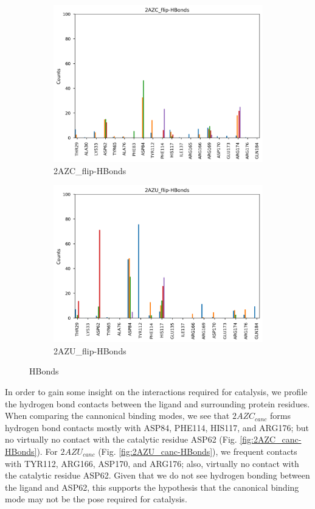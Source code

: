\documentclass[fleqn,10pt]{wlscirep}
\begin{document}
\begin{figure}[!ht]
\begin{subfigure}{.45\textwidth}
     \includegraphics[width=.95\linewidth]{2AZC_flip/2AZC_flip-HBonds.png}
     \caption{2AZC_{flip}-HBonds}
     \label{fig:2AZC_flip-HBonds}
   \end{subfigure}
    \begin{subfigure}{.45\textwidth}
     \centering
     \includegraphics[width=.95\linewidth]{2AZU_flip/2AZU_flip-HBonds.png}
     \caption{2AZU_{flip}-HBonds}
     \label{fig:2AZU_flip-HBonds}
   \end{subfigure}
\caption{HBonds}
\label{fig:HBonds}
\end{figure}  

In order to gain some insight on the interactions required for catalysis, we profile the hydrogen bond contacts between the ligand and surrounding protein residues.
When comparing the cannonical binding modes, we see that $2AZC_{canc}$ forms hydrogen bond contacts mostly with ASP84, PHE114, HIS117, and ARG176; but no virtually no contact with the catalytic residue ASP62 (Fig. \ref{fig:2AZC_canc-HBonds}).
For $2AZU_{canc}$ (Fig. \ref{fig:2AZU_canc-HBonds}), we frequent contacts with TYR112, ARG166, ASP170, and ARG176; also, virtually no contact with the catalytic residue ASP62.
Given that we do not see hydrogen bonding between the ligand and ASP62, this supports the hypothesis that the canonical binding mode may not be the pose required for catalysis.
\end{document}
